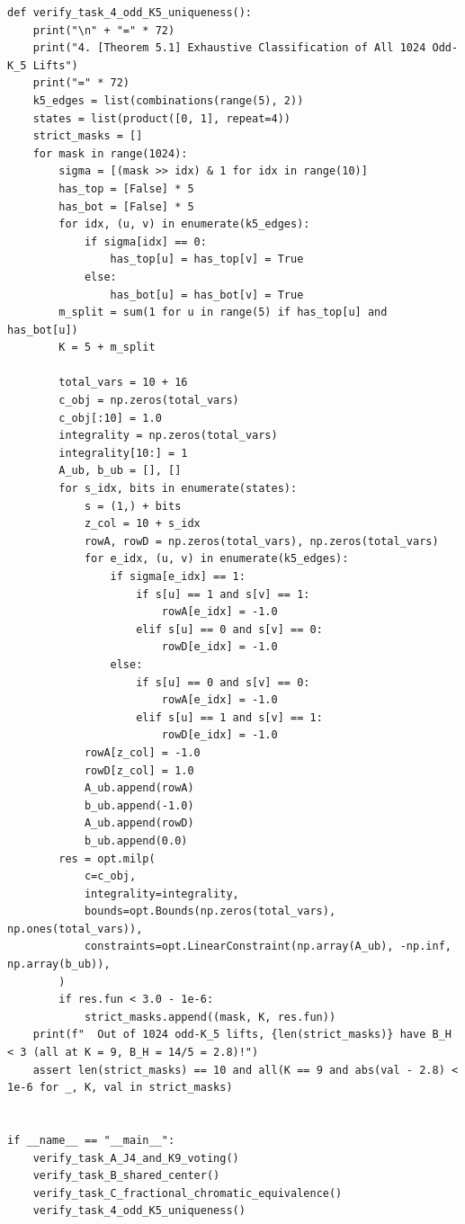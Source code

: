 \documentclass[11pt,a4paper]{ctexart}
\theoremstyle{definition}
\newcommand{\1}{\boldsymbol 1}
\newcommand{\0}{\boldsymbol 0}
\begin{document}
\begin{lstlisting}[style=pycode,caption={一般 $B_{\rm graph}$ 核心定理与 9 分类器 $R_0$ 反例精确复核脚本（\texttt{Bgraph\_breakthrough\_verify.py}）}]
def verify_task_4_odd_K5_uniqueness():
    print("\n" + "=" * 72)
    print("4. [Theorem 5.1] Exhaustive Classification of All 1024 Odd-K_5 Lifts")
    print("=" * 72)
    k5_edges = list(combinations(range(5), 2))
    states = list(product([0, 1], repeat=4))
    strict_masks = []
    for mask in range(1024):
        sigma = [(mask >> idx) & 1 for idx in range(10)]
        has_top = [False] * 5
        has_bot = [False] * 5
        for idx, (u, v) in enumerate(k5_edges):
            if sigma[idx] == 0:
                has_top[u] = has_top[v] = True
            else:
                has_bot[u] = has_bot[v] = True
        m_split = sum(1 for u in range(5) if has_top[u] and has_bot[u])
        K = 5 + m_split

        total_vars = 10 + 16
        c_obj = np.zeros(total_vars)
        c_obj[:10] = 1.0
        integrality = np.zeros(total_vars)
        integrality[10:] = 1
        A_ub, b_ub = [], []
        for s_idx, bits in enumerate(states):
            s = (1,) + bits
            z_col = 10 + s_idx
            rowA, rowD = np.zeros(total_vars), np.zeros(total_vars)
            for e_idx, (u, v) in enumerate(k5_edges):
                if sigma[e_idx] == 1:
                    if s[u] == 1 and s[v] == 1:
                        rowA[e_idx] = -1.0
                    elif s[u] == 0 and s[v] == 0:
                        rowD[e_idx] = -1.0
                else:
                    if s[u] == 0 and s[v] == 0:
                        rowA[e_idx] = -1.0
                    elif s[u] == 1 and s[v] == 1:
                        rowD[e_idx] = -1.0
            rowA[z_col] = -1.0
            rowD[z_col] = 1.0
            A_ub.append(rowA)
            b_ub.append(-1.0)
            A_ub.append(rowD)
            b_ub.append(0.0)
        res = opt.milp(
            c=c_obj,
            integrality=integrality,
            bounds=opt.Bounds(np.zeros(total_vars), np.ones(total_vars)),
            constraints=opt.LinearConstraint(np.array(A_ub), -np.inf, np.array(b_ub)),
        )
        if res.fun < 3.0 - 1e-6:
            strict_masks.append((mask, K, res.fun))
    print(f"  Out of 1024 odd-K_5 lifts, {len(strict_masks)} have B_H < 3 (all at K = 9, B_H = 14/5 = 2.8)!")
    assert len(strict_masks) == 10 and all(K == 9 and abs(val - 2.8) < 1e-6 for _, K, val in strict_masks)


if __name__ == "__main__":
    verify_task_A_J4_and_K9_voting()
    verify_task_B_shared_center()
    verify_task_C_fractional_chromatic_equivalence()
    verify_task_4_odd_K5_uniqueness()
\end{lstlisting}
\end{document}
